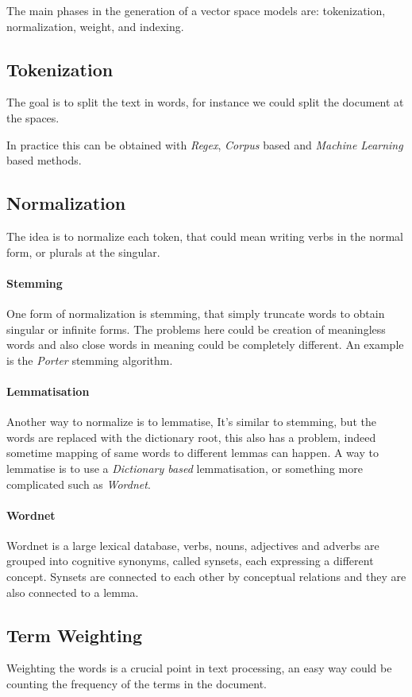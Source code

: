 The main phases in the generation of a vector space models are:
tokenization, normalization, weight, and indexing.

\subsection{Tokenization}
The goal is to split the text in words, for instance we could split the
document at the spaces.

In practice this can be obtained with \emph{Regex}, \emph{Corpus} based and \emph{Machine Learning} based
methods.
\subsection{Normalization}
\label{normalization}
The idea is to normalize each token, that could mean writing verbs in the normal 
form, or plurals at the singular.

\paragraph{Stemming}
One form of normalization is stemming, that simply truncate words 
to obtain singular or infinite forms.
The problems here could be creation of meaningless words and also 
close words in meaning could be completely different. An example
is the \emph{Porter} stemming algorithm.

\paragraph{Lemmatisation}
Another way to normalize is to lemmatise, 
It's similar to stemming, but the words are replaced with the dictionary 
root, this also has a problem, indeed sometime mapping of same words to 
different lemmas can happen. A way to lemmatise is to use a 
\emph{Dictionary based} lemmatisation, or something more complicated 
such as \emph{Wordnet}.

\paragraph{Wordnet}
Wordnet is a large lexical database, verbs, nouns, adjectives and adverbs are
grouped into cognitive synonyms, called synsets, each expressing
a different concept.
Synsets are connected to each other by conceptual relations and they are also 
connected to a lemma.

\subsection{Term Weighting}
Weighting the words is a crucial point in text processing, 
an easy way could be counting the frequency of the terms in the document.

